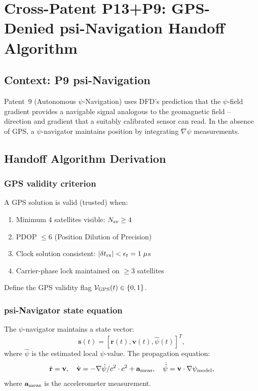 \documentclass[aps,prd,twocolumn,superscriptaddress,nofootinbib]{revtex4-2}
\begin{document}
\section{Cross-Patent P13+P9: GPS-Denied psi-Navigation Handoff Algorithm}

\subsection{Context: P9 psi-Navigation}

Patent~9 (Autonomous $\psi$-Navigation) uses DFD's prediction that the
$\psi$-field gradient provides a navigable signal analogous to the
geomagnetic field -- direction and gradient that a suitably calibrated
sensor can read. In the absence of GPS, a $\psi$-navigator maintains
position by integrating $\nabla\psi$ measurements.

\subsection{Handoff Algorithm Derivation}

\subsubsection{GPS validity criterion}

A GPS solution is valid (trusted) when:
\begin{enumerate}
\item Minimum 4 satellites visible: $N_{\rm sv} \geq 4$
\item PDOP $\leq 6$ (Position Dilution of Precision)
\item Clock solution consistent: $|\delta t_{\rm rx}| < \epsilon_t = 1\;\mu$s
\item Carrier-phase lock maintained on $\geq 3$ satellites
\end{enumerate}

Define the GPS validity flag $\mathcal{V}_{\rm GPS}(t) \in \{0, 1\}$.

\subsubsection{psi-Navigator state equation}

The $\psi$-navigator maintains a state vector:
\begin{equation}
\mathbf{s}(t) = [\mathbf{r}(t), \mathbf{v}(t), \hat{\psi}(t)]^T,
\end{equation}
where $\hat{\psi}$ is the estimated local $\psi$-value.
The propagation equation:
\begin{equation}
\dot{\mathbf{r}} = \mathbf{v},\quad
\dot{\mathbf{v}} = -\nabla\hat{\psi}/c^2\cdot c^2 + \mathbf{a}_{\rm meas},\quad
\dot{\hat{\psi}} = \mathbf{v}\cdot\nabla\psi_{\rm model},
\label{eq:psi_nav_ode}
\end{equation}
where $\mathbf{a}_{\rm meas}$ is the accelerometer measurement.
\end{document}
